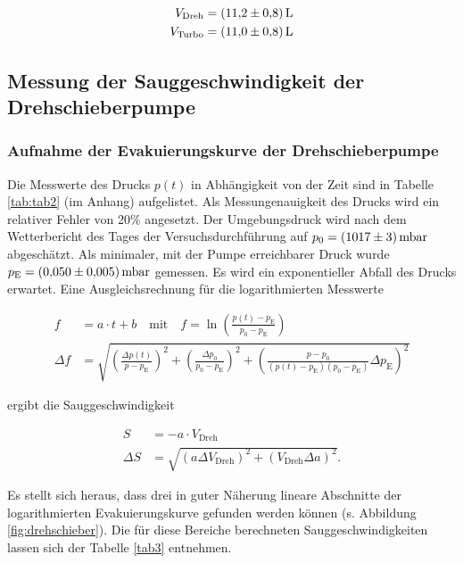 \begin{align}
	V_\text{Dreh} &= \SI{11.2+-0.8}{\litre}\\
	V_\text{Turbo} &= \SI{11.0+-0.8}{\litre}
\end{align}


\subsection{Messung der Sauggeschwindigkeit der Drehschieberpumpe}

\subsubsection{Aufnahme der Evakuierungskurve der Drehschieberpumpe}

Die Messwerte des Drucks $p(t)$ in Abhängigkeit von der Zeit sind in Tabelle \ref{tab:tab2} (im Anhang) aufgelistet. Als Messungenauigkeit des Drucks wird ein relativer Fehler von 20\% angesetzt. Der Umgebungsdruck wird nach dem Wetterbericht des Tages der Versuchsdurchführung \cite{wetter} auf $p_0 = \SI{1017 +-3}{\milli \bar}$ abgeschätzt. Als minimaler, mit der Pumpe erreichbarer Druck wurde $p_\text{E} = \SI{0.05+-0.005}{\milli \bar}$ gemessen. Es wird ein exponentieller Abfall des Drucks erwartet. Eine Ausgleichsrechnung für die logarithmierten Messwerte

\begin{align}
	f &= a \cdot t + b \quad \text{mit} \quad f = \ln \left(\frac{p(t) -p_\text{E}}{p_0 - p_\text{E}}\right)\\
	\Delta f &= \sqrt{\left(\frac{\Delta p(t)}{p-p_\text{E}}\right)^2 + \left(\frac{\Delta p_0}{p_0 - p_\text{E}}\right)^2 + \left(\frac{p- p_0}{(p(t) - p_\text{E}) (p_0 - p_\text{E})} \Delta p_\text{E}\right)^2}
\end{align}

ergibt die Sauggeschwindigkeit

\begin{align}
	S &= - a \cdot V_\text{Dreh}\\
	\Delta S &= \sqrt{\left(a \Delta V_\text{Dreh}\right)^2 + \left(V_\text{Dreh} \Delta a\right)^2}.
\end{align}

Es stellt sich heraus, dass drei in guter Näherung lineare Abschnitte der logarithmierten Evakuierungskurve gefunden werden können (s. Abbildung \ref{fig:drehschieber}). Die für diese Bereiche berechneten Sauggeschwindigkeiten lassen sich der Tabelle \ref{tab3} entnehmen.


